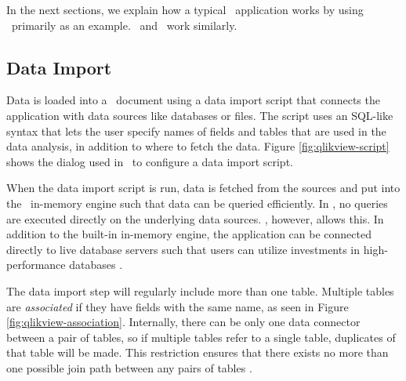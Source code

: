In the next sections, we explain how a typical \bd~application works by using \qlikview~primarily as an example. \tableau~and \powerpivot~work similarly.

\subsection{Data Import}
\label{sub:Data Import}


Data is loaded into a \qlikview~document using a data import script that connects the application with data sources like databases or files. The script uses an SQL-like syntax that lets the user specify names of fields and tables that are used in the data analysis, in addition to where to fetch the data.  Figure \ref{fig:qlikview-script} shows the dialog used in \qlikview~to configure a data import script.

When the data import script is run, data is fetched from the sources and put into the \qlikview~in-memory engine such that data can be queried efficiently. In \qlikview, no queries are executed directly on the underlying data sources. \tableau, however, allows this. In addition to the built-in in-memory engine, the application can be connected directly to live database servers such that users can utilize investments in high-performance databases \cite{Kamkolkar2015-iq}.



The data import step will regularly include more than one table. Multiple tables are \textit{associated} if they have fields with the same name, as seen in Figure \ref{fig:qlikview-association}. Internally, there can be only one data connector between a pair of tables, so if multiple tables refer to a single table, duplicates of that table will be made.
 This restriction ensures that there exists no more than one possible join path between any pairs of tables \cite{noauthor_undated-js}.

